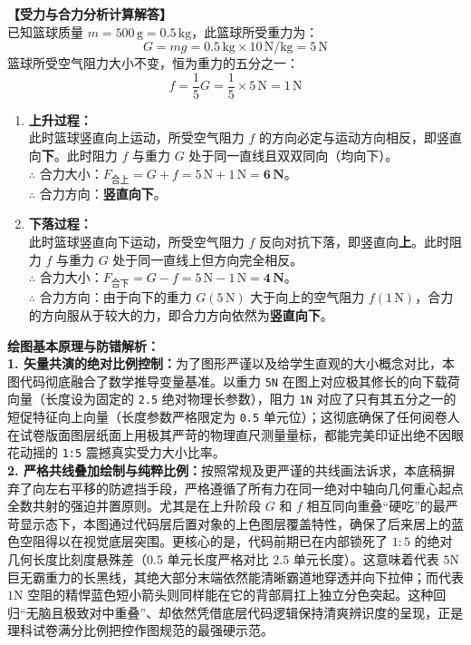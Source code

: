 \vspace{0.4cm}

\textbf{【受力与合力分析计算解答】}\\
已知篮球质量 $m = 500\,\text{g} = 0.5\,\text{kg}$，此篮球所受重力为：
$$ G = mg = 0.5\,\text{kg} \times 10\,\text{N/kg} = 5\,\text{N} $$
篮球所受空气阻力大小不变，恒为重力的五分之一：
$$ f = \frac{1}{5} G = \frac{1}{5} \times 5\,\text{N} = 1\,\text{N} $$

\begin{enumerate}
    \item \textbf{上升过程：}\\
    此时篮球竖直向上运动，所受空气阻力 $f$ 的方向必定与运动方向相反，即竖直向\textbf{下}。此时阻力 $f$ 与重力 $G$ 处于同一直线且双双同向（均向下）。\\
    $\therefore$ 合力大小：$F_{\text{合上}} = G + f = 5\,\text{N} + 1\,\text{N} = \mathbf{6\,\text{N}}$。\\
    $\therefore$ 合力方向：\textbf{竖直向下}。
    
    \item \textbf{下落过程：}\\
    此时篮球竖直向下运动，所受空气阻力 $f$ 反向对抗下落，即竖直向\textbf{上}。此时阻力 $f$ 与重力 $G$ 处于同一直线上但方向完全相反。\\
    $\therefore$ 合力大小：$F_{\text{合下}} = G - f = 5\,\text{N} - 1\,\text{N} = \mathbf{4\,\text{N}}$。\\
    $\therefore$ 合力方向：由于向下的重力 $G (5\,\text{N})$ 大于向上的空气阻力 $f (1\,\text{N})$，合力的方向服从于较大的力，即合力方向依然为\textbf{竖直向下}。
\end{enumerate}

\vspace{0.6cm}

{\small\color{blue!70!black}
\textbf{绘图基本原理与防错解析：}\\
\textbf{1. 矢量共演的绝对比例控制：}为了图形严谨以及给学生直观的大小概念对比，本图代码彻底融合了数学推导变量基准。以重力 \texttt{5N} 在图上对应极其修长的向下载荷向量（长度设为固定的 \texttt{2.5} 绝对物理长参数），阻力 \texttt{1N} 对应了只有其五分之一的短促特征向上向量（长度参数严格限定为 \texttt{0.5} 单元位）；这彻底确保了任何阅卷人在试卷版面图层纸面上用极其严苛的物理直尺测量量标，都能完美印证出绝不因眼花动摇的 \texttt{1:5} 震撼真实受力大小比率。\\
\textbf{2. 严格共线叠加绘制与纯粹比例：}按照常规及更严谨的共线画法诉求，本底稿摒弃了向左右平移的防遮挡手段，严格遵循了所有力在同一绝对中轴向几何重心起点全数共射的强迫并置原则。尤其是在上升阶段 $G$ 和 $f$ 相互同向重叠“硬吃”的最严苛显示态下，本图通过代码层后置对象的上色图层覆盖特性，确保了后来居上的蓝色空阻得以在视觉底层突围。更核心的是，代码前期已在内部锁死了 $1:5$ 的绝对几何长度比刻度悬殊差（$0.5$ 单元长度严格对比 $2.5$ 单元长度）。这意味着代表 $5\text{N}$ 巨无霸重力的长黑线，其绝大部分末端依然能清晰霸道地穿透并向下拉伸；而代表 $1\text{N}$ 空阻的精悍蓝色短小箭头则同样能在它的背部肩扛上独立分色突起。这种回归“无脑且极致对中重叠”、却依然凭借底层代码逻辑保持清爽辨识度的呈现，正是理科试卷满分比例把控作图规范的最强硬示范。
}

